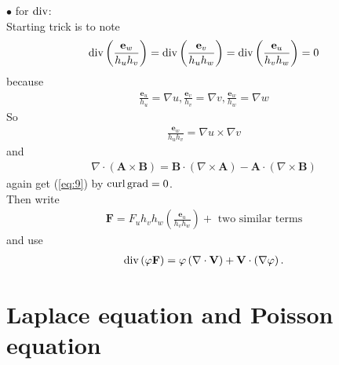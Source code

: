 \documentclass[a4paper]{article}
\begin{document}
$\bullet$ for $\operatorname{div}$:\\
Starting trick is to note
\begin{equation}\label{eq:9}
\begin{aligned}
\operatorname{div}\left(\frac{\mathbf{e}_w}{h_u h_v}\right)=\operatorname{div}\left(\frac{\mathbf{e}_v}{h_u h_w}\right)=\operatorname{div}\left(\frac{\mathbf{e}_u}{h_v h_w}\right)=0
\end{aligned}
\end{equation}
because
\begin{equation*}
\begin{aligned}
\frac{\mathbf{e}_u}{h_u}=\nabla u,\frac{\mathbf{e}_v}{h_v}=\nabla v,\frac{\mathbf{e}_w}{h_w}=\nabla w
\end{aligned}
\end{equation*}
So
\begin{equation*}
\begin{aligned}
\frac{\mathbf{e}_w}{h_u h_v} = \nabla u \times \nabla v
\end{aligned}
\end{equation*}
and
\begin{equation*}
\begin{aligned}
\nabla\cdot\left(\mathbf{A}\times\mathbf{B}\right) = \mathbf{B}\cdot\left(\nabla\times \mathbf{A}\right)-\mathbf{A}\cdot\left(\nabla\times\mathbf{B}\right)
\end{aligned}
\end{equation*}
again get (\ref{eq:9}) by $\operatorname{curl}\operatorname{grad} = 0$.\\
Then write
\begin{equation*}
\begin{aligned}
\mathbf{F}=F_u h_v h_w \left(\frac{\mathbf{e}_u}{h_v h_w}\right) + \text{  two similar terms}
\end{aligned}
\end{equation*}
and use
\begin{equation*}
\begin{aligned}
\operatorname{div}\left(\varphi\mathbf{F}\right) = \varphi\left(\nabla\cdot\mathbf{V}\right)+\mathbf{V}\cdot\left(\nabla\varphi\right).
\end{aligned}
\end{equation*}

\newpage
\section{Laplace equation and Poisson equation}
\end{document}
